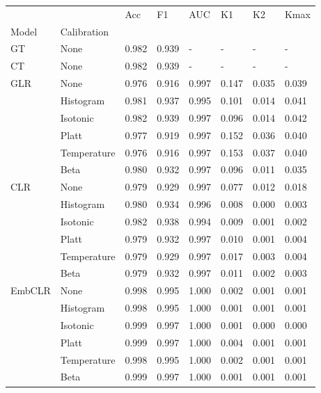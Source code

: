 \begin{tabular}{llllllll}
\toprule
 &  & Acc & F1 & AUC & K1 & K2 & Kmax \\
Model & Calibration &  &  &  &  &  &  \\
\midrule
GT & None & 0.982 & 0.939 & - & - & - & - \\
\cline{1-8}
CT & None & 0.982 & 0.939 & - & - & - & - \\
\cline{1-8}
\multirow[t]{6}{*}{GLR} & None & 0.976 & 0.916 & 0.997 & 0.147 & 0.035 & 0.039 \\
 & Histogram & 0.981 & 0.937 & 0.995 & 0.101 & 0.014 & 0.041 \\
 & Isotonic & 0.982 & 0.939 & 0.997 & 0.096 & 0.014 & 0.042 \\
 & Platt & 0.977 & 0.919 & 0.997 & 0.152 & 0.036 & 0.040 \\
 & Temperature & 0.976 & 0.916 & 0.997 & 0.153 & 0.037 & 0.040 \\
 & Beta & 0.980 & 0.932 & 0.997 & 0.096 & 0.011 & 0.035 \\
\cline{1-8}
\multirow[t]{6}{*}{CLR} & None & 0.979 & 0.929 & 0.997 & 0.077 & 0.012 & 0.018 \\
 & Histogram & 0.980 & 0.934 & 0.996 & 0.008 & 0.000 & 0.003 \\
 & Isotonic & 0.982 & 0.938 & 0.994 & 0.009 & 0.001 & 0.002 \\
 & Platt & 0.979 & 0.932 & 0.997 & 0.010 & 0.001 & 0.004 \\
 & Temperature & 0.979 & 0.929 & 0.997 & 0.017 & 0.003 & 0.004 \\
 & Beta & 0.979 & 0.932 & 0.997 & 0.011 & 0.002 & 0.003 \\
\cline{1-8}
\multirow[t]{6}{*}{EmbCLR} & None & 0.998 & 0.995 & 1.000 & 0.002 & 0.001 & 0.001 \\
 & Histogram & 0.998 & 0.995 & 1.000 & 0.001 & 0.001 & 0.001 \\
 & Isotonic & 0.999 & 0.997 & 1.000 & 0.001 & 0.000 & 0.000 \\
 & Platt & 0.999 & 0.997 & 1.000 & 0.004 & 0.001 & 0.001 \\
 & Temperature & 0.998 & 0.995 & 1.000 & 0.002 & 0.001 & 0.001 \\
 & Beta & 0.999 & 0.997 & 1.000 & 0.001 & 0.001 & 0.001 \\
\cline{1-8}
\bottomrule
\end{tabular}

